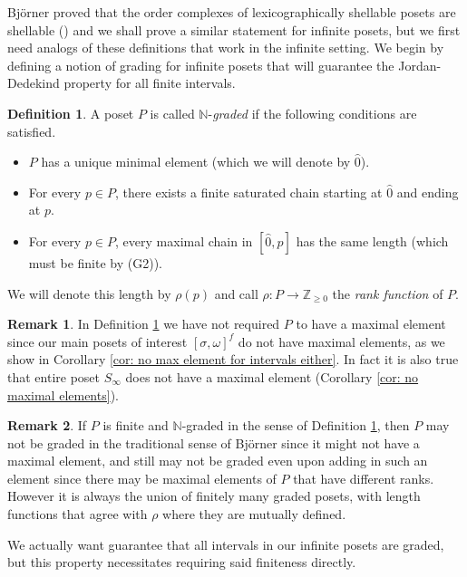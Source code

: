 \documentclass[oneside,11pt,reqno]{amsart}
\newcommand{\zz}{\ensuremath{\mathbb{Z}}}
\newcommand{\nn}{\ensuremath{\mathbb{N}}}
\theoremstyle{definition}
\newtheorem{definition}{Definition}
\newtheorem{remark}{Remark}
\newtheorem{proof techniques}{Proof Techniques}
\begin{document}
Bj\"{o}rner proved that the order complexes of lexicographically shellable posets are shellable (\cite{bjorner1980shellable}) and we shall prove a similar statement for infinite posets, but we first need analogs of these definitions that work in the infinite setting. We begin by defining a notion of grading for infinite posets that will guarantee the Jordan-Dedekind property for all finite intervals. 

\begin{definition}\label{def: graded}
    A poset $P$ is called $\nn$-\emph{graded} if the following conditions are satisfied. 
\begin{itemize}
    \item[(G1)] $P$ has a unique minimal element (which we will denote by $\hat{0}$).
    \item[(G2)] For every $p \in P$, there exists a finite saturated chain starting at $\hat{0}$ and ending at $p$. 
    \item[(G3)] For every $p \in P$, every maximal chain in $[\hat{0} , p]$ has the same length (which must be finite by (G2)).  
\end{itemize}
We will denote this length by $\rho(p)$ and call $\rho: P \to \zz_{\geq 0}$ the \emph{rank function} of $P$.
\end{definition} 

\begin{remark}
In Definition \ref{def: graded} we have not required $P$ to have a maximal element since our main posets of interest $[\sigma , \omega]^f$ do not have maximal elements, as we show in Corollary \ref{cor: no max element for intervals either}. In fact it is also true that entire poset $S_\infty$ does not have a maximal element (Corollary \ref{cor: no maximal elements}). 
\end{remark}

\begin{remark}
    If $P$ is finite and $\nn$-graded in the sense of Definition \ref{def: graded}, then $P$ may not be graded in the traditional sense of Bj\"{o}rner since it might not have a maximal element, and still may not be graded even upon adding in such an element since there may be maximal elements of $P$ that have different ranks. However it is always the union of finitely many graded posets, with length functions that agree with $\rho$ where they are mutually defined.
\end{remark} 

We actually want guarantee that all intervals in our infinite posets are graded, but this property necessitates requiring said finiteness directly.
\end{document}

